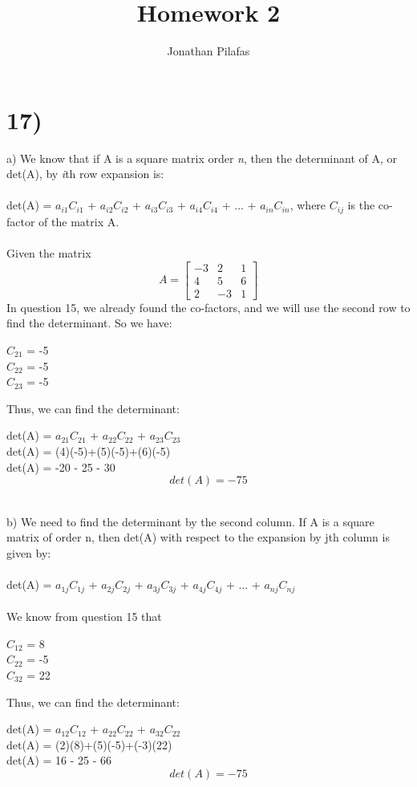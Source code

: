 \documentclass[12pt,a4paper]{extarticle}
\title{Homework 2}
\author{Jonathan Pilafas}
\begin{document}
\maketitle

\section*{17)} 

a) We know that if A is a square matrix order \textit{n}, then the determinant of A, or det(A), by \textit{i}th row expansion is:
\\
\\
det(A) = $a_{i1}$$C_{i1}$ + $a_{i2}$$C_{i2}$ + $a_{i3}$$C_{i3}$ + $a_{i4}$$C_{i4}$ + ... + $a_{in}$$C_{in}$, where $C_{ij}$ is the co-factor of the matrix A.
\\
\\
Given the matrix
\[
	A = \begin{bmatrix}
		-3 & 2 & 1 \\
		4 & 5 & 6 \\
		2 & -3 & 1
	\end{bmatrix}
\]
In question 15, we already found the co-factors, and we will use
the second row to find the determinant. So we have:
\begin{center}
$C_{21}$ = -5 \\
$C_{22}$ = -5 \\
$C_{23}$ = -5
\end{center}
Thus, we can find the determinant:
\begin{center}
det(A) = $a_{21}$$C_{21}$ + $a_{22}$$C_{22}$ + $a_{23}$$C_{23}$\\
det(A) = (4)(-5)+(5)(-5)+(6)(-5) \\
det(A) = -20 - 25 - 30
\[
\boxed{det(A) = -75}
\]
\end{center}
\\
b) We need to find the determinant by the second column. If A is a square matrix of order n, then det(A) with respect to the expansion by jth column is given by:
\\
\\
det(A) = $a_{1j}$$C_{1j}$ + $a_{2j}$$C_{2j}$ + $a_{3j}$$C_{3j}$ + $a_{4j}$$C_{4j}$ + ... + $a_{nj}$$C_{nj}$
\\
\\
We know from question 15 that
\begin{center}
$C_{12}$ = 8 \\
$C_{22}$ = -5 \\
$C_{32}$ = 22
\end{center}
Thus, we can find the determinant:
\begin{center}
det(A) = $a_{12}$$C_{12}$ + $a_{22}$$C_{22}$ + $a_{32}$$C_{22}$\\
det(A) = (2)(8)+(5)(-5)+(-3)(22) \\
det(A) = 16 - 25 - 66
\[
\boxed{det(A) = -75}
\]
\end{center}
\newpage
\end{document}
